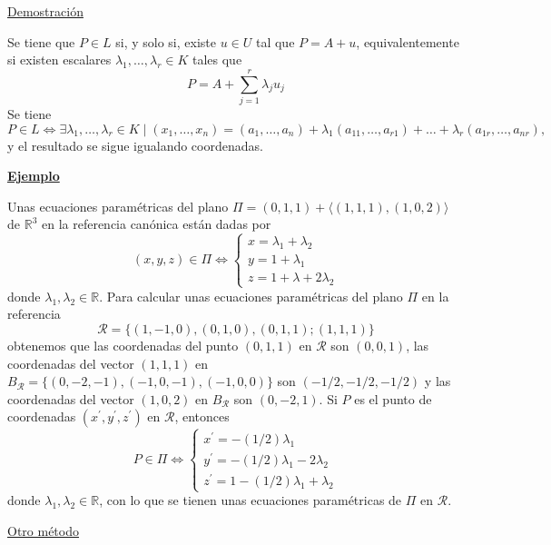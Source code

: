 \documentclass[12pt, a4paper, ones, notitlepage, openany,titlepage]{article}
\newcommand{\demostracion}{\noindent\underline{Demostración}}
\newcommand{\ejemplo}{\noindent\underline{\textbf{Ejemplo}}}
\begin{document}
\demostracion 

Se tiene que $P \in L$ si, y solo si, existe $u \in U$ tal que $P=A+u$, equivalentemente si existen escalares $\lambda_{1}, \ldots, \lambda_{r} \in K$ tales que
$$
P=A+\sum_{j=1}^{r} \lambda_{j} u_{j}
$$
\noindent Se tiene
$$
P \in L \Longleftrightarrow \exists \lambda_{1}, \ldots, \lambda_{r} \in K \mid\left(x_{1}, \ldots, x_{n}\right)=\left(a_{1}, \ldots, a_{n}\right)+\lambda_{1}\left(a_{11}, \ldots, a_{r 1}\right)+\ldots+\lambda_{r}\left(a_{1 r}, \ldots, a_{n r}\right),
$$
y el resultado se sigue igualando coordenadas.

\ejemplo

Unas ecuaciones paramétricas del plano $\Pi=(0,1,1)+\langle(1,1,1),(1,0,2)\rangle$ de $\mathbb{R}^{3}$ en la referencia canónica están dadas por
$$
(x, y, z) \in \Pi \Longleftrightarrow\left\{\begin{array}{l}
x=\lambda_{1}+\lambda_{2} \\
y=1+\lambda_{1} \\
z=1+\lambda+2 \lambda_{2}
\end{array}\right.
$$
donde $\lambda_{1}, \lambda_{2} \in \mathbb{R}$. Para calcular unas ecuaciones paramétricas del plano $\Pi$ en la referencia
$$
\mathcal{R}=\{(1,-1,0),(0,1,0),(0,1,1) ;(1,1,1)\}
$$
obtenemos que las coordenadas del punto $(0,1,1)$ en $\mathcal{R}$ son $(0,0,1)$, las coordenadas del vector $(1,1,1)$ en $B_{\mathcal{R}}=\{(0,-2,-1),(-1,0,-1),(-1,0,0)\}$ son $(-1 / 2,-1 / 2,-1 / 2)$ y las coordenadas del vector $(1,0,2)$ en $B_{\mathcal{R}}$ son $(0,-2,1)$. Si $P$ es el punto de coordenadas $\left(x^{\prime}, y^{\prime}, z^{\prime}\right)$ en $\mathcal{R}$, entonces
$$
P \in \Pi \Longleftrightarrow\left\{\begin{array}{l}
x^{\prime}=-(1 / 2) \lambda_{1} \\
y^{\prime}=-(1 / 2) \lambda_{1}-2 \lambda_{2} \\
z^{\prime}=1-(1 / 2) \lambda_{1}+\lambda_{2}
\end{array}\right.
$$
donde $\lambda_{1}, \lambda_{2} \in \mathbb{R}$, con lo que se tienen unas ecuaciones paramétricas de $\Pi$ en $\mathcal{R}$.

\noindent\underline{Otro método}
\end{document}
